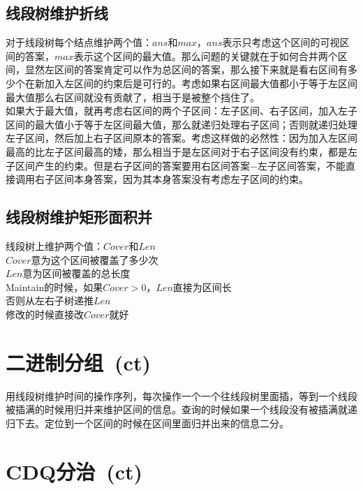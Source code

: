     \subsection*{线段树维护折线}
        对于线段树每个结点维护两个值：$ ans $和$ max $，$ ans $表示只考虑这个区间的可视区间的答案，$ max $表示这个区间的最大值。那么问题的关键就在于如何合并两个区间，显然左区间的答案肯定可以作为总区间的答案，那么接下来就是看右区间有多少个在新加入左区间的约束后是可行的。考虑如果右区间最大值都小于等于左区间最大值那么右区间就没有贡献了，相当于是被整个挡住了。
        \\如果大于最大值，就再考虑右区间的两个子区间：左子区间、右子区间，加入左子区间的最大值小于等于左区间最大值，那么就递归处理右子区间；否则就递归处理左子区间，然后加上右子区间原本的答案。考虑这样做的必然性：因为加入左区间最高的比左子区间最高的矮，那么相当于是左区间对于右子区间没有约束，都是左子区间产生的约束。但是右子区间的答案要用右区间答案$ - $左子区间答案，不能直接调用右子区间本身答案，因为其本身答案没有考虑左子区间的约束。
    \subsection*{线段树维护矩形面积并}
        \noindent 线段树上维护两个值：$ Cover $和$ Len $
        \\$ Cover $意为这个区间被覆盖了多少次
        \\$ Len $意为区间被覆盖的总长度
        \\Maintain的时候，如果$ Cover > 0 $，$ Len $直接为区间长
        \\否则从左右子树递推$ Len $
        \\修改的时候直接改$ Cover $就好
\section{二进制分组\ \small(ct)}
    用线段树维护时间的操作序列，每次操作一个一个往线段树里面插，等到一个线段被插满的时候用归并来维护区间的信息。查询的时候如果一个线段没有被插满就递归下去。定位到一个区间的时候在区间里面归并出来的信息二分。
\section{CDQ分治\ \small(ct)}

